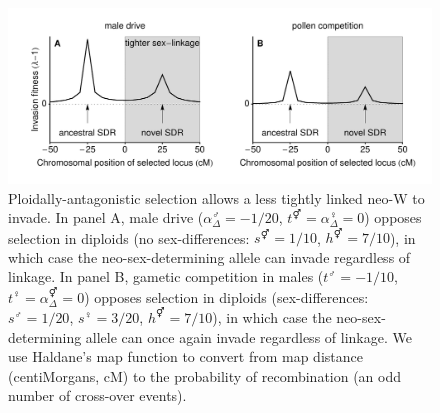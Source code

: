 \documentclass[12pt]{article}
\begin{document}
\begin{figure}[!h]
\centering
\includegraphics[width=\linewidth]{PositionPlot_8}
\caption{
Ploidally-antagonistic selection allows a less tightly linked neo-W to invade.
In panel A, male drive ($\alpha^\male_{\Delta} = -1/20$, $t^\Hermaphrodite = \alpha^\female_{\Delta} = 0$) opposes selection in diploids (no sex-differences: $s^\Hermaphrodite = 1/10$, $h^\Hermaphrodite = 7/10$), in which case the neo-sex-determining allele can invade regardless of linkage.   
In panel B, gametic competition in males ($t^\male = -1/10$, $t^\female = \alpha^\Hermaphrodite_{\Delta} = 0$) opposes selection in diploids (sex-differences: $s^\male = 1/20$, $s^\female = 3/20$, $h^\Hermaphrodite = 7/10$), in which case the neo-sex-determining allele can once again invade regardless of linkage.
We use Haldane's map function \citep[Equation 3 in ][]{Haldane1919} to convert from map distance (centiMorgans, cM) to the probability of recombination (an odd number of cross-over events).   
}
\label{fig:Combination_Centimorgans}
\end{figure}
\end{document}
